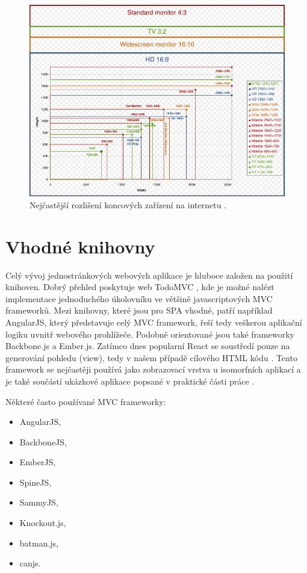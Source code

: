 \begin{figure}[h]
\begin{centering}
\includegraphics[scale=0.4]{obrazky/resolutions}
\par\end{centering}
\caption{Nejčastější rozlišení koncových zařízení na internetu \cite{mobile_popularity}. \label{fig:resolutions}}
\end{figure}
\FloatBarrier

\section{Vhodné knihovny}
Celý vývoj jednostránkových webových aplikace je hluboce založen na použití knihoven. Dobrý přehled poskytuje web TodoMVC \cite{todomvc}, kde je možné nalézt implementace jednoduchého úkolovníku ve většině javascriptových MVC frameworků. Mezi knihovny, které jsou pro SPA vhodné, patří například AngularJS, který představuje celý MVC framework, řeší tedy veškerou aplikační logiku uvnitř webového prohlížeče. Podobně orientované jsou také frameworky Backbone.js a Ember.js. Zatímco dnes popularní React se soustředí pouze na generování pohledu (view), tedy v našem případě cílového HTML kódu \cite{react}. Tento framework se nejčastěji používá jako zobrazovací vrstva u isomorfních aplikací a je také součástí ukázkové aplikace popsané v praktické části práce \cite{spa} \cite{spa_book}.

\vspace{0.3cm}
\noindent Některé často používané MVC frameworky:
\begin{itemize}
\item AngularJS,
\item BackboneJS,
\item EmberJS,
\item SpineJS,
\item SammyJS,
\item Knockout.js,
\item batman.js,
\item canjs.
\end{itemize}

